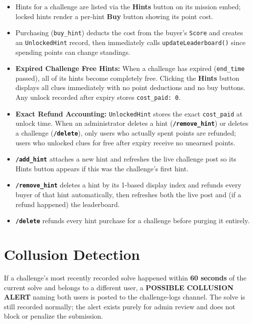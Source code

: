\documentclass[12pt,a4paper]{report}
\newcommand{\cmd}[1]{\texttt{\color{cybercyan}\textbf{#1}}}
\begin{document}
\begin{itemize}
    \item Hints for a challenge are listed via the \textbf{Hints} button on its mission embed;
          locked hints render a per-hint \textbf{Buy} button showing its point cost.
    \item Purchasing (\texttt{buy\_hint}) deducts the cost from the buyer's \texttt{Score} and
          creates an \texttt{UnlockedHint} record, then immediately calls
          \texttt{updateLeaderboard()} since spending points can change standings.
    \item \textbf{Expired Challenge Free Hints:} When a challenge has expired (\texttt{end\_time} passed),
          all of its hints become completely free. Clicking the \textbf{Hints} button displays all clues
          immediately with no point deductions and no buy buttons. Any unlock recorded after expiry
          stores \texttt{cost\_paid: 0}.
    \item \textbf{Exact Refund Accounting:} \texttt{UnlockedHint} stores the exact \texttt{cost\_paid}
          at unlock time. When an administrator deletes a hint (\cmd{/remove\_hint}) or deletes a
          challenge (\cmd{/delete}), only users who actually spent points are refunded; users who unlocked
          clues for free after expiry receive no unearned points.
    \item \cmd{/add\_hint} attaches a new hint and refreshes the live challenge post so its Hints
          button appears if this was the challenge's first hint.
    \item \cmd{/remove\_hint} deletes a hint by its 1-based display index and refunds every buyer
          of that hint automatically, then refreshes both the live post and (if a refund happened)
          the leaderboard.
    \item \cmd{/delete} refunds every hint purchase for a challenge before purging it entirely.
\end{itemize}

\section{Collusion Detection}

If a challenge's most recently recorded solve happened within \textbf{60 seconds} of the current
solve and belongs to a different user, a \textbf{POSSIBLE COLLUSION ALERT} naming both users is
posted to the challenge-logs channel. The solve is still recorded normally; the alert exists purely
for admin review and does not block or penalize the submission.
\end{document}
